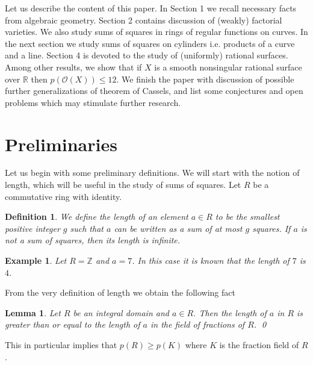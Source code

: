 \documentclass[12pt,reqno]{amsart}   	%
\newtheorem{lemma}[thm]{Lemma}
\newtheorem{df}[thm]{Definition}
\newtheorem{ex}[thm]{Example}
\theoremstyle{obs}
\theoremstyle{prob}
\theoremstyle{conj}
\theoremstyle{remark}
\newcommand{\R}{\mathbb{R}}
\newcommand{\OO}{\mathcal{O}}
\begin{document}
Let us describe the content of this paper. 
In Section 1 we recall necessary facts from algebraic geometry. Section 2 contains discussion of (weakly) factorial varieties. We also study sums of squares in rings of regular functions on curves. In the next section we study sums of squares on cylinders i.e. products of a curve and a line. Section 4 is devoted to the study of (uniformly) rational surfaces. Among other results, we show that if $X$ is a smooth nonsingular rational surface over $\R$ then $p(\OO(X)) \leq 12$. We finish the paper with discussion of possible further generalizations of theorem of Cassels, and list some conjectures and open problems which may stimulate further research.






\section{Preliminaries}

Let us begin with some preliminary definitions. We will start with the notion of  length, which will be useful in the study of sums of squares. Let $R$ be a commutative ring with identity.
\begin{df}
 We define the length of an element $a \in R$ to be the smallest positive integer $g$ such that $a$ can be written as a sum of at most $g$ squares. If $a$ is not a sum of squares, then its length is infinite.
\end{df}
\begin{ex}
Let $R=\mathbb{Z}$ and $a=7$. In this case it is known that the length of $7$ is $4$.
\end{ex}

From the very definition of length we obtain the following fact

\begin{lemma}\label{lemma}
Let $R$ be an integral domain and $a \in R$.
Then the length of $a$ in $R$ is greater than or equal to the length of $a$ in the field of fractions of $R$.  \qed
\end{lemma}
This in particular implies that $p(R) \geq p(K)$ where $K$ is the fraction field of $R$.
\end{document}
